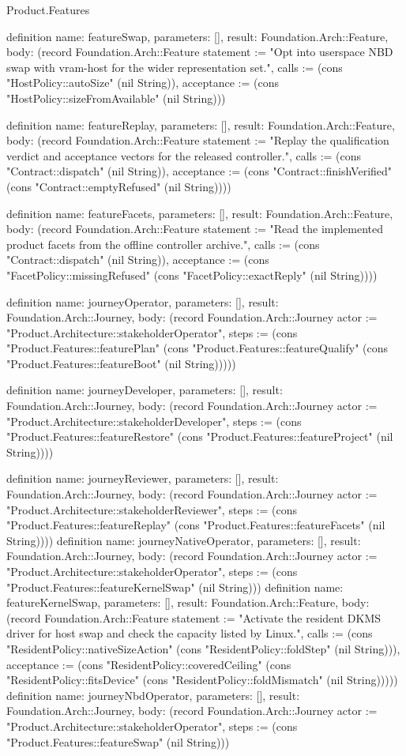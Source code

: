 \begin{lexlean}{Product.Features}
\begin{semanticmodule}
definition{
  name: featureSwap, parameters: [], result: Foundation.Arch::Feature,
  body: (record Foundation.Arch::Feature {statement := "Opt into userspace NBD swap with vram-host for the wider representation set.", calls := (cons "HostPolicy::autoSize" (nil String)), acceptance := (cons "HostPolicy::sizeFromAvailable" (nil String))})
}

definition{
  name: featureReplay, parameters: [], result: Foundation.Arch::Feature,
  body: (record Foundation.Arch::Feature {statement := "Replay the qualification verdict and acceptance vectors for the released controller.", calls := (cons "Contract::dispatch" (nil String)), acceptance := (cons "Contract::finishVerified" (cons "Contract::emptyRefused" (nil String)))})
}

definition{
  name: featureFacets, parameters: [], result: Foundation.Arch::Feature,
  body: (record Foundation.Arch::Feature {statement := "Read the implemented product facets from the offline controller archive.", calls := (cons "Contract::dispatch" (nil String)), acceptance := (cons "FacetPolicy::missingRefused" (cons "FacetPolicy::exactReply" (nil String)))})
}

definition{
  name: journeyOperator, parameters: [], result: Foundation.Arch::Journey,
  body: (record Foundation.Arch::Journey {actor := "Product.Architecture::stakeholderOperator", steps := (cons "Product.Features::featurePlan" (cons "Product.Features::featureQualify" (cons "Product.Features::featureBoot" (nil String))))})
}

definition{
  name: journeyDeveloper, parameters: [], result: Foundation.Arch::Journey,
  body: (record Foundation.Arch::Journey {actor := "Product.Architecture::stakeholderDeveloper", steps := (cons "Product.Features::featureRestore" (cons "Product.Features::featureProject" (nil String)))})
}

definition{
  name: journeyReviewer, parameters: [], result: Foundation.Arch::Journey,
  body: (record Foundation.Arch::Journey {actor := "Product.Architecture::stakeholderReviewer", steps := (cons "Product.Features::featureReplay" (cons "Product.Features::featureFacets" (nil String)))})
}
definition{
  name: journeyNativeOperator, parameters: [], result: Foundation.Arch::Journey,
  body: (record Foundation.Arch::Journey {actor := "Product.Architecture::stakeholderOperator", steps := (cons "Product.Features::featureKernelSwap" (nil String))})
}
definition{
  name: featureKernelSwap, parameters: [], result: Foundation.Arch::Feature,
  body: (record Foundation.Arch::Feature {statement := "Activate the resident DKMS driver for host swap and check the capacity listed by Linux.", calls := (cons "ResidentPolicy::nativeSizeAction" (cons "ResidentPolicy::foldStep" (nil String))), acceptance := (cons "ResidentPolicy::coveredCeiling" (cons "ResidentPolicy::fitsDevice" (cons "ResidentPolicy::foldMismatch" (nil String))))})
}
definition{
  name: journeyNbdOperator, parameters: [], result: Foundation.Arch::Journey,
  body: (record Foundation.Arch::Journey {actor := "Product.Architecture::stakeholderOperator", steps := (cons "Product.Features::featureSwap" (nil String))})
}
\end{semanticmodule}
\end{lexlean}

